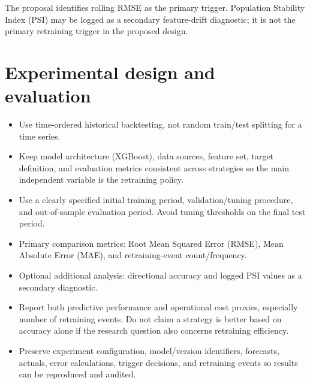 \documentclass[11pt,a4paper]{article}
\begin{document}
The proposal identifies rolling RMSE as the primary trigger. Population Stability Index (PSI) may be logged as a secondary feature-drift diagnostic; it is not the primary retraining trigger in the proposed design.

\section{Experimental design and evaluation}
\begin{itemize}
  \item Use time-ordered historical backtesting, not random train/test splitting for a time series.
  \item Keep model architecture (XGBoost), data sources, feature set, target definition, and evaluation metrics consistent across strategies so the main independent variable is the retraining policy.
  \item Use a clearly specified initial training period, validation/tuning procedure, and out-of-sample evaluation period. Avoid tuning thresholds on the final test period.
  \item Primary comparison metrics: Root Mean Squared Error (RMSE), Mean Absolute Error (MAE), and retraining-event count/frequency.
  \item Optional additional analysis: directional accuracy and logged PSI values as a secondary diagnostic.
  \item Report both predictive performance and operational cost proxies, especially number of retraining events. Do not claim a strategy is better based on accuracy alone if the research question also concerns retraining efficiency.
  \item Preserve experiment configuration, model/version identifiers, forecasts, actuals, error calculations, trigger decisions, and retraining events so results can be reproduced and audited.
\end{itemize}
\end{document}
